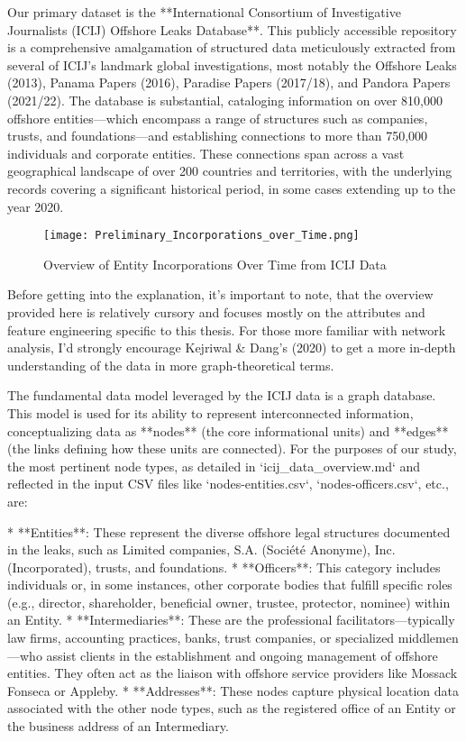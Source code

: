 Our primary dataset is the **International Consortium of Investigative Journalists (ICIJ) Offshore Leaks Database**. This publicly accessible repository is a comprehensive amalgamation of structured data meticulously extracted from several of ICIJ's landmark global investigations, most notably the Offshore Leaks (2013), Panama Papers (2016), Paradise Papers (2017/18), and Pandora Papers (2021/22). The database is substantial, cataloging information on over 810,000 offshore entities—which encompass a range of structures such as companies, trusts, and foundations—and establishing connections to more than 750,000 individuals and corporate entities. These connections span across a vast geographical landscape of over 200 countries and territories, with the underlying records covering a significant historical period, in some cases extending up to the year 2020.

\begin{figure}[htbp]
    \centering
    \texttt{[image: Preliminary\_Incorporations\_over\_Time.png]}
    \caption{Overview of Entity Incorporations Over Time from ICIJ Data}
    \label{fig:incorporations_time}
\end{figure}

Before getting into the explanation, it's important to note, that the overview provided here is relatively cursory and focuses mostly on the attributes and feature engineering specific to this thesis. For those more familiar with network analysis, I'd strongly encourage Kejriwal \& Dang's (2020) to get a more in-depth understanding of the data in more graph-theoretical terms.

The fundamental data model leveraged by the ICIJ data is a graph database. This model is used for its ability to represent interconnected information, conceptualizing data as **nodes** (the core informational units) and **edges** (the links defining how these units are connected). For the purposes of our study, the most pertinent node types, as detailed in `icij_data_overview.md` and reflected in the input CSV files like `nodes-entities.csv`, `nodes-officers.csv`, etc., are:

*   **Entities**: These represent the diverse offshore legal structures documented in the leaks, such as Limited companies, S.A. (Société Anonyme), Inc. (Incorporated), trusts, and foundations.
*   **Officers**: This category includes individuals or, in some instances, other corporate bodies that fulfill specific roles (e.g., director, shareholder, beneficial owner, trustee, protector, nominee) within an Entity.
*   **Intermediaries**: These are the professional facilitators—typically law firms, accounting practices, banks, trust companies, or specialized middlemen—who assist clients in the establishment and ongoing management of offshore entities. They often act as the liaison with offshore service providers like Mossack Fonseca or Appleby.
*   **Addresses**: These nodes capture physical location data associated with the other node types, such as the registered office of an Entity or the business address of an Intermediary.

